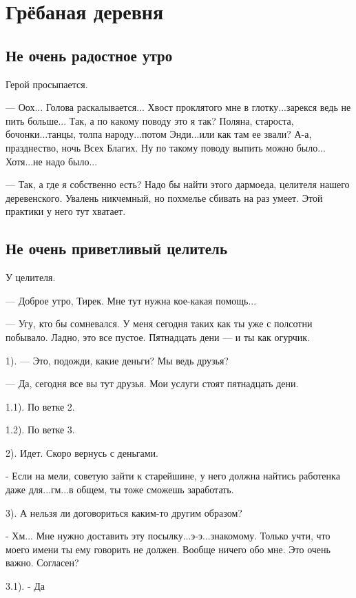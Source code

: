 \documentclass[12pt,a4paper]{book}
\begin{document}
\chapter{Грёбаная деревня}

\section{Не очень радостное утро}

Герой просыпается.

--- Оох... Голова раскалывается... Хвост проклятого мне в глотку...зарекся ведь не пить больше... Так, а по какому поводу это я так? Поляна, староста, бочонки...танцы, толпа народу...потом Энди...или как там ее звали? А-а, празднество, ночь Всех Благих. Ну по такому поводу выпить можно было... Хотя...не надо было...

--- Так, а где я собственно есть? Надо бы найти этого дармоеда, целителя нашего деревенского. Увалень никчемный, но похмелье сбивать на раз умеет. Этой практики у него тут хватает.

\section{Не очень приветливый целитель}

У целителя.

--- Доброе утро, Тирек. Мне тут нужна кое-какая помощь... 

--- Угу, кто бы сомневался. У меня сегодня таких как ты уже с полсотни побывало. Ладно, это все пустое. Пятнадцать дени --- и ты как огурчик.

1). --- Это, подожди, какие деньги? Мы ведь друзья? 

--- Да, сегодня все вы тут друзья. Мои услуги стоят пятнадцать дени.

1.1). По ветке 2.

1.2). По ветке 3. 

2). Идет. Скоро вернусь с деньгами.

- Если на мели, советую зайти к старейшине, у него должна найтись работенка даже для...гм...в общем, ты тоже сможешь заработать. 

3). А нельзя ли договориться каким-то другим образом?

- Хм... Мне нужно доставить эту посылку...э-э...знакомому. Только учти, что моего имени ты ему говорить не должен. Вообще ничего обо мне. Это очень важно. Согласен?

3.1). - Да
\end{document}
